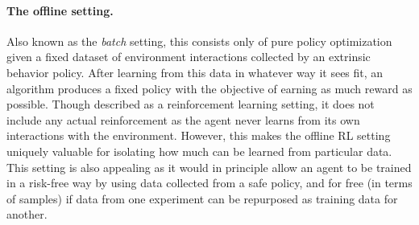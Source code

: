 \paragraph{The offline setting.}
Also known as the \emph{batch} setting, this consists only of pure policy optimization given a fixed dataset of environment interactions collected by an extrinsic behavior policy.
After learning from this data in whatever way it sees fit, an algorithm produces a fixed policy with the objective of earning as much reward as possible.
Though described as a reinforcement learning setting, it does not include any actual reinforcement as the agent never learns from its own interactions with the environment.
However, this makes the offline RL setting uniquely valuable for isolating how much can be learned from particular data.
This setting is also appealing as it would in principle allow an agent to be trained in a risk-free way by using data collected from a safe policy, and for free (in terms of samples) if data from one experiment can be repurposed as training data for another.


